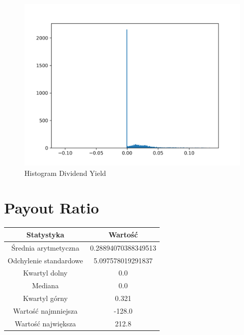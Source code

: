 \documentclass{article}
\begin{document}
\begin{figure}[h!]
    \includegraphics[width=\linewidth]{variables/Dividend Yield.png}
    \caption{Histogram Dividend Yield }
\end{figure}\section{ Payout Ratio }

\begin{center}
    \begin{tabular}{|c | c|} 
    \hline
    Statystyka & Wartość \\
    \hline\hline
    Średnia arytmetyczna & 0.28894070388349513 \\ 
    \hline
    Odchylenie standardowe & 5.097578019291837 \\
    \hline
    Kwartyl dolny & 0.0 \\
    \hline
    Mediana & 0.0 \\
    \hline
    Kwartyl górny & 0.321 \\
    \hline
    Wartość najmniejsza & -128.0 \\
    \hline
    Wartość największa & 212.8 \\
    \hline
   \end{tabular}
\end{center}
\end{document}
